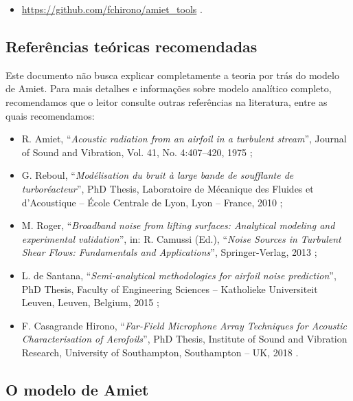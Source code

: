 \documentclass[a4paper, 11pt, twoside]{article}
\begin{document}
\begin{itemize}
	\item \url{https://github.com/fchirono/amiet_tools} .
\end{itemize}


\subsection{Referências teóricas recomendadas}

Este documento não busca explicar completamente a teoria por trás do modelo de Amiet. Para mais detalhes e informações sobre modelo analítico completo, recomendamos que o leitor consulte outras referências na literatura, entre as quais recomendamos:

\begin{itemize}
	\item R. Amiet, ``\emph{Acoustic radiation from an airfoil in a turbulent stream}'', Journal of Sound and Vibration, Vol. 41, No. 4:407–420, 1975 \cite{Amiet75};
	
	\item G. Reboul, ``\emph{Modélisation du bruit à large bande de soufflante de turboréacteur}'', PhD Thesis, Laboratoire de Mécanique des Fluides et d’Acoustique -- École Centrale de Lyon, Lyon -- France, 2010 \cite{Reboul10};
	
	\item M. Roger, ``\emph{Broadband noise from lifting surfaces: Analytical modeling and experimental validation}'', in: R. Camussi (Ed.), ``\emph{Noise Sources in Turbulent Shear Flows: Fundamentals and Applications}'', Springer-Verlag, 2013 \cite{Roger13};
	
	\item L. de Santana, ``\emph{Semi-analytical methodologies for airfoil noise prediction}'', PhD Thesis, Faculty of Engineering Sciences -- Katholieke Universiteit Leuven, Leuven, Belgium, 2015 \cite{deSantana2015};
	
	\item F. Casagrande Hirono, ``\emph{Far-Field Microphone Array Techniques for Acoustic Characterisation of Aerofoils}'', PhD Thesis, Institute of Sound and Vibration Research, University of Southampton, Southampton -- UK, 2018 \cite{Casagrande18}.
\end{itemize}


\subsection{O modelo de Amiet}
\end{document}
